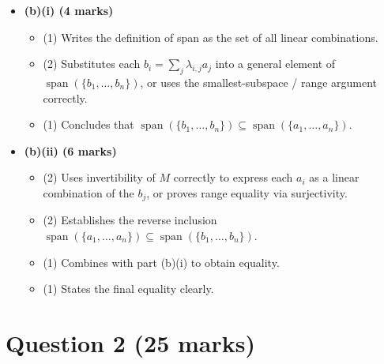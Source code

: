 \documentclass[12pt]{article}
\newcommand{\Span}{\operatorname{span}}
\begin{document}
\begin{itemize}[leftmargin=1.6em]
  \item \textbf{(b)(i) (4 marks)}
  \begin{itemize}[leftmargin=1.6em]
    \item (1) Writes the definition of span as the set of all linear combinations.
    \item (2) Substitutes each \(b_i=\sum_j\lambda_{i,j}a_j\) into a general element of \(\Span(\{b_1,\ldots,b_n\})\), or uses the smallest-subspace / range argument correctly.
    \item (1) Concludes that \(\Span(\{b_1,\ldots,b_n\})\subseteq \Span(\{a_1,\ldots,a_n\})\).
  \end{itemize}

  \item \textbf{(b)(ii) (6 marks)}
  \begin{itemize}[leftmargin=1.6em]
    \item (2) Uses invertibility of \(M\) correctly to express each \(a_i\) as a linear combination of the \(b_j\), or proves range equality via surjectivity.
    \item (2) Establishes the reverse inclusion \(\Span(\{a_1,\ldots,a_n\})\subseteq \Span(\{b_1,\ldots,b_n\})\).
    \item (1) Combines with part (b)(i) to obtain equality.
    \item (1) States the final equality clearly.
  \end{itemize}
\end{itemize}
\newpage
\section{Question 2 \hfill (25 marks)}
\end{document}
